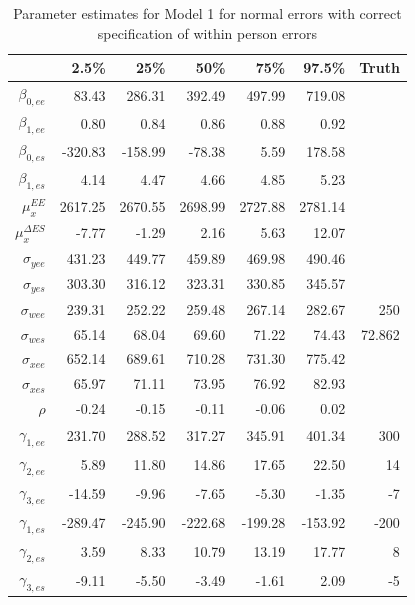 \documentclass[11pt]{article}\usepackage[]{graphicx}\usepackage[]{color}
\begin{document}
\begin{table}[ht]
\centering
\begin{tabular}{rrrrrr|r}
  \hline
 & 2.5\% & 25\% & 50\% & 75\% & 97.5\% & Truth\\ 
  \hline
$\beta_{0,ee}$ & 83.43 & 286.31 & 392.49 & 497.99 & 719.08 \\ 
  $\beta_{1,ee}$ & 0.80 & 0.84 & 0.86 & 0.88 & 0.92 \\ 
  $\beta_{0,es}$ & -320.83 & -158.99 & -78.38 & 5.59 & 178.58 \\ 
  $\beta_{1,es}$ & 4.14 & 4.47 & 4.66 & 4.85 & 5.23 \\ 
  $\mu_x^{EE}$ & 2617.25 & 2670.55 & 2698.99 & 2727.88 & 2781.14 \\ 
  $\mu_x^{\Delta ES}$ & -7.77 & -1.29 & 2.16 & 5.63 & 12.07 \\ 
  $\sigma_{yee}$ & 431.23 & 449.77 & 459.89 & 469.98 & 490.46 \\ 
  $\sigma_{yes}$ & 303.30 & 316.12 & 323.31 & 330.85 & 345.57 \\ 
  $\sigma_{wee}$ & 239.31 & 252.22 & 259.48 & 267.14 & 282.67 & 250\\ 
  $\sigma_{wes}$ & 65.14 & 68.04 & 69.60 & 71.22 & 74.43 & 72.862 \\ 
  $\sigma_{xee}$ & 652.14 & 689.61 & 710.28 & 731.30 & 775.42 \\ 
  $\sigma_{xes}$ & 65.97 & 71.11 & 73.95 & 76.92 & 82.93 \\ 
  $\rho$ & -0.24 & -0.15 & -0.11 & -0.06 & 0.02 \\ 
  $\gamma_{1,ee}$ & 231.70 & 288.52 & 317.27 & 345.91 & 401.34 & 300\\ 
  $\gamma_{2,ee}$ & 5.89 & 11.80 & 14.86 & 17.65 & 22.50 & 14\\ 
  $\gamma_{3,ee}$ & -14.59 & -9.96 & -7.65 & -5.30 & -1.35 & -7\\ 
  $\gamma_{1,es}$ & -289.47 & -245.90 & -222.68 & -199.28 & -153.92 &-200 \\ 
  $\gamma_{2,es}$ & 3.59 & 8.33 & 10.79 & 13.19 & 17.77 & 8\\ 
  $\gamma_{3,es}$ & -9.11 & -5.50 & -3.49 & -1.61 & 2.09 & -5\\ 
   \hline
\end{tabular}
\caption{Parameter estimates for Model 1 for normal errors with correct specification of within person errors}
\label{m1wpestimates}
\end{table}
\end{document}
